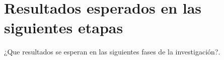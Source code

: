 \chapter{Resultados esperados en las siguientes etapas}
\ifpdf
    \graphicspath{{Chapter3/Chapter3Figs/PNG/}{Chapter3/Chapter3Figs/PDF/}{Chapter3/ChapterFigs/}}
\else
    \graphicspath{{Chapter3/Chapter3Figs/EPS/}{Chapter3/Chapter3Figs/}}
\fi


¿Que resultados se esperan en las siguientes fases de la investigación?.



